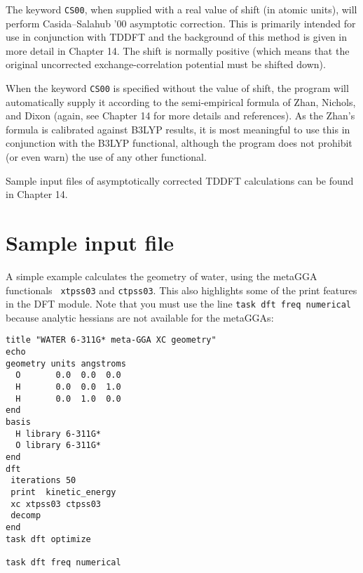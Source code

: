 The keyword \verb+CS00+, when supplied with a real value of shift (in atomic units),
will perform Casida--Salahub '00 asymptotic correction.  This is primarily intended
for use in conjunction with TDDFT and the background of this method is given in more
detail in Chapter 14.  The shift is normally positive (which means that the original
uncorrected exchange-correlation potential must be shifted down).

When the keyword \verb+CS00+ is specified without the value of shift, the program will
automatically supply it according to the semi-empirical formula of Zhan, Nichols, and
Dixon (again, see Chapter 14 for more details and references).  As the Zhan's formula 
is calibrated against B3LYP results, it is most meaningful to use this in conjunction
with the B3LYP functional, although the program does not prohibit (or even warn) the use
of any other functional.

Sample input files of asymptotically corrected TDDFT calculations can be found in 
Chapter 14.

\section{Sample input file}
\label{sec:DFTsample}
A simple example  calculates the geometry
 of water, using the metaGGA functionals
\verb+ xtpss03+ and \verb+ctpss03+.
This also highlights some of
the print features in the DFT module.  Note
that you must use the line
\verb+task dft freq numerical+ because
analytic hessians are not available for the metaGGAs:
\begin{verbatim}
title "WATER 6-311G* meta-GGA XC geometry"
echo
geometry units angstroms
  O       0.0  0.0  0.0
  H       0.0  0.0  1.0
  H       0.0  1.0  0.0
end
basis
  H library 6-311G*
  O library 6-311G*
end
dft
 iterations 50
 print  kinetic_energy
 xc xtpss03 ctpss03
 decomp
end
task dft optimize

task dft freq numerical
\end{verbatim}




